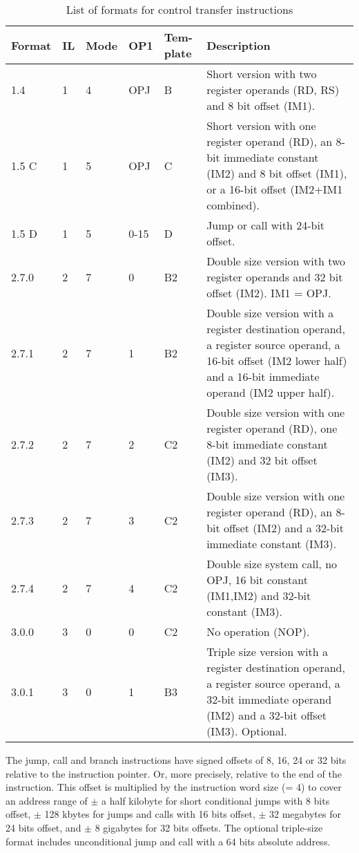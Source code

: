 \documentclass[forwardcom.tex]{subfiles}
\begin{document}
\begin{longtable}
{|p{10mm}|p{8mm}|p{8mm}|p{8mm}|p{8mm}|p{70mm}|}
\caption{List of formats for control transfer instructions}
\label{table:jumpInstructionFormats}
\endfirsthead
\endhead
\hline
Format & IL & Mode & OP1 & Tem-plate & Description \\
\hline
1.4 & 1 & 4 & OPJ & B & Short version with two register operands (RD, RS) and 8 bit offset  (IM1).  \\
\hline
1.5 C & 1 & 5 & OPJ & C & Short version with one register operand (RD), an 8-bit immediate constant (IM2) and 8 bit offset (IM1), or a 16-bit offset (IM2+IM1 combined). \\
\hline
1.5 D & 1 & 5 & 0-15 & D & Jump or call with 24-bit offset. \\
\hline
2.7.0 & 2 & 7 & 0 & B2 & Double size version with two register operands and 32 bit offset  (IM2). IM1 = OPJ. \\
\hline
2.7.1 & 2 & 7 & 1 & B2 & Double size version with a register destination operand, a register source operand, a 16-bit offset (IM2 lower half) and a 16-bit immediate operand (IM2 upper half).  \\
\hline
2.7.2 & 2 & 7 & 2 & C2 & Double size version with one register operand (RD), one 8-bit immediate constant (IM2) and 32 bit offset (IM3). \\
\hline
2.7.3 & 2 & 7 & 3 & C2 & Double size version with one register operand (RD), an 8-bit offset (IM2) and a 32-bit immediate constant (IM3).  \\
\hline
2.7.4 & 2 & 7 & 4 & C2 & Double size system call, no OPJ, 16 bit constant (IM1,IM2) and 32-bit constant (IM3). \\
\hline
3.0.0 & 3 & 0 & 0 & C2 & No operation (NOP). \\
\hline
3.0.1 & 3 & 0 & 1 & B3 & Triple size version with a register destination operand, a register source operand, a 32-bit immediate operand (IM2) and a 32-bit offset (IM3). Optional.  \\
\hline
\end{longtable}

The jump, call and branch instructions have signed offsets of 8, 16, 24 or 32 bits relative to the instruction pointer. Or, more precisely, relative to the end of the instruction. This offset is multiplied by the instruction word size (= 4) to cover an address range of $\pm$ a half kilobyte for short conditional jumps with 8 bits offset, $\pm$ 128 kbytes for jumps and calls with 16 bits offset, $\pm$ 32 megabytes for 24 bits offset, and $\pm$ 8 gigabytes for 32 bits offsets. The optional triple-size format includes unconditional jump and call with a 64 bits absolute address.
\vspace{2mm}
\end{document}

